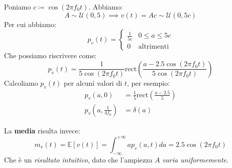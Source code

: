 Poniamo $c\coloneqq \cos (2\pi f_{0}t)$. Abbiamo:
\[
    A \sim \mathcal{U}(0,5) \implies v(t) = Ac \sim \mathcal{U}(0,5c)
\]
Per cui abbiamo:
\[
    p_v(t) = \begin{cases}
        \frac{1}{5c} & 0 \le a \le 5c \\ 
        0 & \text{altrimenti}
    \end{cases}
\]
Che possiamo riscrivere come:
\[
    p_v(t) = \frac{1}{5 \cos(2\pi f_{0}t)} \text{rect} \left( 
               \frac{a - 2.5 \cos(2\pi f_{0}t)}{5 \cos(2\pi f_{0}t)} \right)
\]
Calcoliamo $p_v(t)$ per alcuni valori di $t$, per esempio:
\[
    \begin{aligned}
        p_v(a,0) &= \frac{1}{5} \text{rect} \left( \frac{a-2.5}{5} \right) \\ 
        p_v \left(a, \frac{1}{4f_{0}} \right) &= \delta(a)
    \end{aligned}
\]

La \textbf{media} risulta invece:
\[
    m_v(t) = \mathbb{E}[v(t)] = \int_{-\infty}^{+\infty} a p_v(a,t) da = 2.5 \cos(2\pi f_{0}t)
\]
Che è un \textit{risultato intuitivo}, dato che l'ampiezza $A$ \textit{varia uniformemente}.
